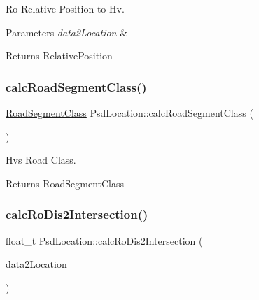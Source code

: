 Ro Relative Position to Hv. 


\begin{DoxyParams}{Parameters}
{\em data2\+Location} & \\
\hline
\end{DoxyParams}
\begin{DoxyReturn}{Returns}
Relative\+Position 
\end{DoxyReturn}
\mbox{\label{class_psd_location_a49111bfc564db23a9c64612d285ff4bc}} 
\subsubsection{\texorpdfstring{calc\+Road\+Segment\+Class()}{calcRoadSegmentClass()}}
{\footnotesize\ttfamily \hyperlink{_psd_message_decoder_8h_a4f9adeb93dfc3dac7961fa97e890b1a5}{Road\+Segment\+Class} Psd\+Location\+::calc\+Road\+Segment\+Class (\begin{DoxyParamCaption}{ }\end{DoxyParamCaption})}



Hv\textquotesingle{}s Road Class. 

\begin{DoxyReturn}{Returns}
Road\+Segment\+Class 
\end{DoxyReturn}
\mbox{\label{class_psd_location_ae9cfb75671bc47a49d167ff8d7d5093c}} 
\subsubsection{\texorpdfstring{calc\+Ro\+Dis2\+Intersection()}{calcRoDis2Intersection()}}
{\footnotesize\ttfamily float\+\_\+t Psd\+Location\+::calc\+Ro\+Dis2\+Intersection (\begin{DoxyParamCaption}\item[{\hyperlink{_psd_location_8h_a1e3a92020005d2a81aa50ba5ae9b129c}{Data2\+Location}}]{data2\+Location }\end{DoxyParamCaption})}



